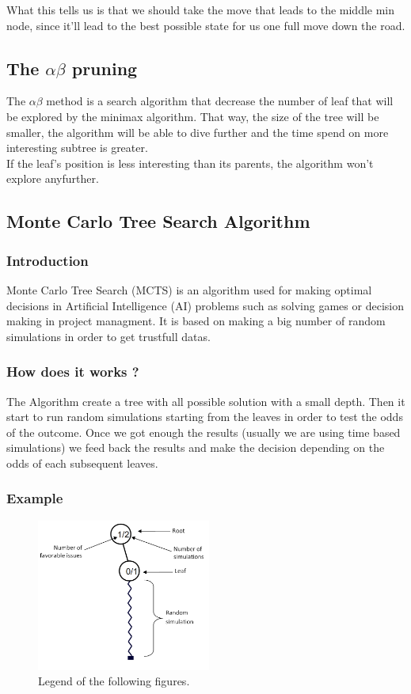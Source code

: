 \noindent
What this tells us is that we should take the move that leads to the middle min node, since it'll lead to the best possible state for us one full move down the road. 

\subsection{The \ensuremath{\alpha\beta} pruning} %
The \ensuremath{\alpha\beta} method is a search algorithm that decrease the number of leaf that will be explored by the minimax algorithm. That way, the size of the tree will be smaller, the algorithm will be able to dive further and the time spend on more interesting subtree is greater.\\
If the leaf's position is less interesting than its parents, the algorithm won't explore anyfurther.

\subsection{Monte Carlo Tree Search Algorithm}
\subsubsection{Introduction}
Monte Carlo Tree Search (MCTS) is an algorithm used for making optimal decisions in Artificial Intelligence (AI) problems such as solving games or decision making in project managment. It is based on making a big number of random simulations in order to get trustfull datas.
\subsubsection{How does it works ?}
The Algorithm create a tree with all possible solution with a small depth.
Then it start to run random simulations starting from the leaves in order to test the odds of the outcome.
Once we got enough the results (usually we are using time based simulations) we feed back the results and make the decision depending on the odds of each subsequent leaves.
\subsubsection{Example}
\label{sec:example}
\begin{figure}[H]
\centering
\includegraphics[height=5cm]{1_Presentation/1.2_Algorithm_MCTS_Benoit/img/schema.png}
\caption{\label{fig:schema}Legend of the following figures.}
\end{figure}

